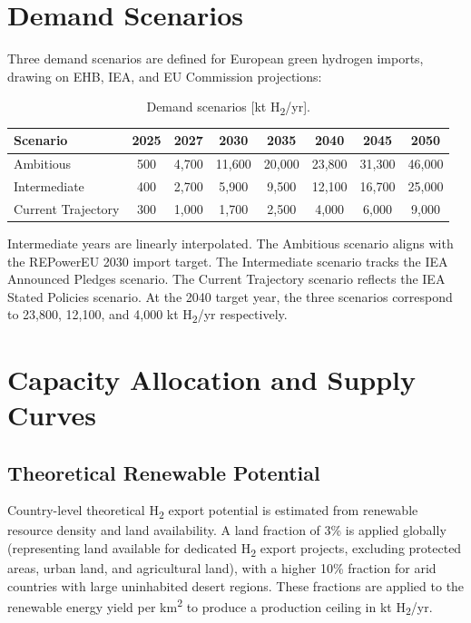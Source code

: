 \section{Demand Scenarios}
\label{sec:demand}

Three demand scenarios are defined for European green hydrogen imports, drawing on EHB, IEA, and EU Commission projections:

\begin{table}[htbp]
    \centering
    \caption{Demand scenarios [kt H\textsubscript{2}/yr].}
    \label{tab:demand-scenarios}
    \small
    \begin{tabular}{lccccccc}
        \toprule
        Scenario & 2025 & 2027 & 2030 & 2035 & 2040 & 2045 & 2050 \\
        \midrule
        Ambitious          & 500 & 4{,}700 & 11{,}600 & 20{,}000 & 23{,}800 & 31{,}300 & 46{,}000 \\
        Intermediate       & 400 & 2{,}700 & 5{,}900  & 9{,}500  & 12{,}100 & 16{,}700 & 25{,}000 \\
        Current Trajectory & 300 & 1{,}000 & 1{,}700  & 2{,}500  & 4{,}000  & 6{,}000  & 9{,}000  \\
        \bottomrule
    \end{tabular}
\end{table}

Intermediate years are linearly interpolated. The Ambitious scenario aligns with the REPowerEU 2030 import target. The Intermediate scenario tracks the IEA Announced Pledges scenario. The Current Trajectory scenario reflects the IEA Stated Policies scenario. At the 2040 target year, the three scenarios correspond to 23{,}800, 12{,}100, and 4{,}000 kt H\textsubscript{2}/yr respectively.

\section{Capacity Allocation and Supply Curves}
\label{sec:capacity}

\subsection{Theoretical Renewable Potential}

Country-level theoretical H\textsubscript{2} export potential is estimated from renewable resource density and land availability. A land fraction of 3\% is applied globally (representing land available for dedicated H\textsubscript{2} export projects, excluding protected areas, urban land, and agricultural land), with a higher 10\% fraction for arid countries with large uninhabited desert regions. These fractions are applied to the renewable energy yield per km\textsuperscript{2} to produce a production ceiling in kt H\textsubscript{2}/yr.


